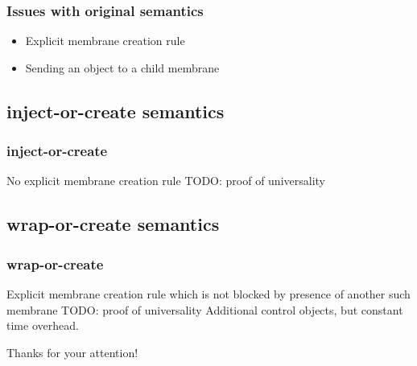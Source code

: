     \begin{frame}[t]\frametitle{Issues with original semantics}
      \begin{itemize}
        \item Explicit membrane creation rule
        \item Sending an object to a child membrane
      \end{itemize}
    \end{frame}
    \note{}
  

  \subsection{inject-or-create semantics} %
  \label{sub:inject_or_create_semantics}

    \begin{frame}[t]\frametitle{inject-or-create}
      No explicit membrane creation rule
      TODO: proof of universality
    \end{frame}
    \note{}


  \subsection{wrap-or-create semantics} %
  \label{sub:wrap_or_create_semantics}
  
    \begin{frame}[t]\frametitle{wrap-or-create}
      Explicit membrane creation rule which is not blocked by presence of another such membrane
      TODO: proof of universality
      Additional control objects, but constant time overhead.
    \end{frame}
    \note{}



\begin{frame}[plain]
  
\end{frame}

\begin{frame}[plain]
  \begin{center}
    Thanks for your attention!
  \end{center}
\end{frame}


